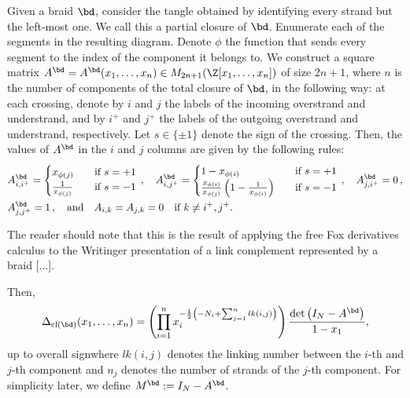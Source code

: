 \documentclass[11pt,e-only]{amsart}
\begin{document}
Given a braid $\bd$, consider the tangle obtained by identifying every strand but the left-most one. We call this a partial closure of $\bd$. Enumerate each of the segments in the resulting diagram. Denote $\phi$ the function that sends every segment to the index of the component it belongs to. We construct a square matrix $A^{\bd}=A^{\bd}(x_1,\dots,x_n)\in M_{2n+1}(\Z[x_1,\dots,x_n])$ of size \alert{$2n+1$}, where $n$ is the number of components of the total closure of $\bd$, in the following way: at each crossing, denote by $i$ and $j$ the labels of the incoming overstrand and understrand, and by $i^+$ and $j^+$ the labels of the outgoing overstrand and understrand, respectively. Let $s\in\{\pm1\}$ denote the sign of the crossing. Then, the values of $A^{\bd}$ in the $i$ and $j$ columns are given by the following rules:
\begin{equation}\label{eq:A-rules}
\begin{split}
    &A_{i,i^+}^\bd=\begin{cases}
        x_{\phi(j)} &\quad \text{if } s=+1 \\
        \frac{1}{x_{\phi(j)}} &\quad \text{if } s=-1 \\
    \end{cases}
    \, , \hspace{1em}
    A_{i,j^+}^\bd=\begin{cases}
        1-x_{\phi(i)} &\quad \text{if } s=+1 \\
        \frac{x_{\phi(i)}}{x_{\phi(j)}}\left(1-\frac{1}{x_{\phi(i)}}\right) &\quad \text{if } s=-1 \\
    \end{cases}
    \, , \hspace{1em}
    A_{j,i^+}^\bd=0
    \, , \\&
    A_{j,j^+}^\bd=1
    \, , \hspace{1em}\text{and}\hspace{1em}
    A_{i,k}=A_{j,k}=0 \quad \text{if } k\neq i^+,j^+.
    \end{split}
\end{equation}

The reader should note that this is the result of applying the free Fox derivatives calculus to the Writinger presentation of a link complement represented by a braid [...].

Then,
\begin{equation}
    \Delta_{\mathrm{cl}(\bd)}(x_1,\dots,x_n) = \left(\prod_{i=1}^n x_i^{-\frac{1}{2}\left(-N_i+\sum_{j=1}^n lk(i,j)\right)}\right) \frac{\det{\left(I_{N}-A^\bd\right)}}{1-x_1},
\end{equation}
\alert{up to overall sign}where $lk(i,j)$ denotes the linking number between the $i$-th and $j$-th component and $n_j$ denotes the number of strands of the $j$-th component. For simplicity later, we define $M^\bd:=I_{N}-A^\bd$. %
\end{document}

